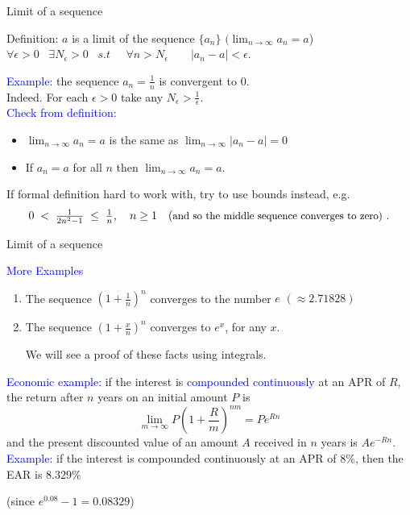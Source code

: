\documentclass[11pt,aspectratio=169]{beamer}
\begin{document}
\begin{frame}{Limit of a sequence}

\begin{alertblock}{Definition: $a$ is a limit of the sequence $\{a_n\}$\;\; $(\lim_{n\to \infty}a_n=a$)}
\qquad\qquad$
\forall \epsilon >0 \;\;\; \exists N_{\epsilon}>0\;\;\; s.t\;\;\;\;\;\forall n>N_{\epsilon}\quad\quad \vert a_n-a \vert < \epsilon.
$	
\end{alertblock}

 \textcolor{blue}{Example:}  the sequence $a_n=\frac{1}{n}$ is convergent to 0. \\[3mm]
\qquad Indeed. For each $\epsilon>0$ take any $N_{\epsilon}>\frac{1}{\epsilon}$. \\[2mm]
 \textcolor{blue}{Check from definition:} 
 \begin{itemize}
 	\item $\lim_{n\to\infty} a_n=a$ is the same as $\lim_{n\to \infty} |a_n-a|=0$\\[2mm]
 	\item If $a_n=a$ for all $n$ then $\lim_{n\to\infty}a_n=a$.
 \end{itemize}

\begin{block}{If formal definition hard to work with, try to use \alert{bounds} instead, e.g.}
$$
0\;<\;\tfrac{1}{2n^2-1}\;\leq\; \tfrac{1}{n}, \quad n \geq 1 \quad \mbox{{(\small and so the middle sequence converges to zero)}	}.
$$
\end{block}
\end{frame}

\begin{frame}{Limit of a sequence}

\textcolor{blue}{More Examples} 
\begin{enumerate}

\item The sequence $\left(1+\frac{1}{n}\right)^n$ converges to the number $e$  $(\approx 2.71828)$ 
\item The sequence $\left(1+\frac{x}{n}\right)^n$ converges to $e^x$, for any $x$. \begin{tiny}We will see a proof of these facts using integrals.  \end{tiny}
\end{enumerate}


\textcolor{blue}{Economic example:} if the interest is \textcolor{blue}{compounded continuously} at an APR of $R$, the return after $n$ years on an initial amount $P$ is 
$$
\lim_{m\rightarrow \infty} P\left(1+\frac{R}{m}\right)^{n m}=P e^{Rn}
$$ 
and the present discounted value of an amount $A$ received in $n$ years is $A e^{-Rn}$. 
\vskip 12pt
\textcolor{blue}{Example:} if the interest is compounded continuously at an APR of $8\%$, then the EAR is $8.329\%$ \begin{tiny}(since $e^{0.08}-1=0.08329$) \end{tiny}  \end{frame}
\end{document}
